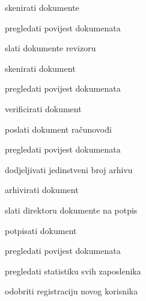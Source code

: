			
			\begin{packed_enum}
				\item  {}
				
				\begin{packed_enum}
					
					\item skenirati dokumente
					\item pregledati povijest dokumenata
					\item slati dokumente revizoru
					
				\end{packed_enum}
			
				\item  {}
				
				\begin{packed_enum}
					
					\item skenirati dokument
					\item pregledati povijest dokumenata
					\item verificirati dokument
					\item poslati dokument računovođi
					
				\end{packed_enum}
			
				\item  {}
				
				\begin{packed_enum}
					
					\item pregledati povijest dokumenata
					\item dodjeljivati jedinstveni broj arhivu
					\item arhivirati dokument
					\item slati direktoru dokumente na potpis
					
					
				\end{packed_enum}
			
				\item  {}
				
				\begin{packed_enum}
					
					\item potpisati dokument
					\item pregledati povijest  dokumenata
					\item pregledati statistiku svih zaposlenika
					\item odobriti registraciju novog korisnika
					

\end{packed_enum}
\end{packed_enum}
